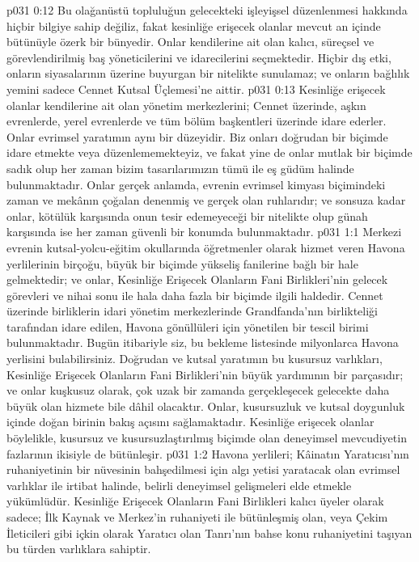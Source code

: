 \vs p031 0:12 Bu olağanüstü topluluğun gelecekteki işleyişsel düzenlenmesi hakkında hiçbir bilgiye sahip değiliz, fakat kesinliğe erişecek olanlar mevcut an içinde bütünüyle özerk bir bünyedir. Onlar kendilerine ait olan kalıcı, süreçsel ve görevlendirilmiş baş yöneticilerini ve idarecilerini seçmektedir. Hiçbir dış etki, onların siyasalarının üzerine buyurgan bir nitelikte sunulamaz; ve onların bağlılık yemini sadece Cennet Kutsal Üçlemesi’ne aittir.
\vs p031 0:13 Kesinliğe erişecek olanlar kendilerine ait olan yönetim merkezlerini; Cennet üzerinde, aşkın evrenlerde, yerel evrenlerde ve tüm bölüm başkentleri üzerinde idare ederler. Onlar evrimsel yaratımın aynı bir düzeyidir. Biz onları doğrudan bir biçimde idare etmekte veya düzenlememekteyiz, ve fakat yine de onlar mutlak bir biçimde sadık olup her zaman bizim tasarılarımızın tümü ile eş güdüm halinde bulunmaktadır. Onlar gerçek anlamda, evrenin evrimsel kimyası biçimindeki zaman ve mekânın çoğalan denenmiş ve gerçek olan ruhlarıdır; ve sonsuza kadar onlar, kötülük karşısında onun tesir edemeyeceği bir nitelikte olup günah karşısında ise her zaman güvenli bir konumda bulunmaktadır.
\vs p031 1:1 Merkezi evrenin kutsal\hyp{}yolcu\hyp{}eğitim okullarında öğretmenler olarak hizmet veren Havona yerlilerinin birçoğu, büyük bir biçimde yükseliş fanilerine bağlı bir hale gelmektedir; ve onlar, Kesinliğe Erişecek Olanların Fani Birlikleri’nin gelecek görevleri ve nihai sonu ile hala daha fazla bir biçimde ilgili haldedir. Cennet üzerinde birliklerin idari yönetim merkezlerinde Grandfanda’nın birlikteliği tarafından idare edilen, Havona gönüllüleri için yönetilen bir tescil birimi bulunmaktadır. Bugün itibariyle siz, bu bekleme listesinde milyonlarca Havona yerlisini bulabilirsiniz. Doğrudan ve kutsal yaratımın bu kusursuz varlıkları, Kesinliğe Erişecek Olanların Fani Birlikleri’nin büyük yardımının bir parçasıdır; ve onlar kuşkusuz olarak, çok uzak bir zamanda gerçekleşecek gelecekte daha büyük olan hizmete bile dâhil olacaktır. Onlar, kusursuzluk ve kutsal doygunluk içinde doğan birinin bakış açısını sağlamaktadır. Kesinliğe erişecek olanlar böylelikle, kusursuz ve kusursuzlaştırılmış biçimde olan deneyimsel mevcudiyetin fazlarının ikisiyle de bütünleşir.
\vs p031 1:2 Havona yerlileri; Kâinatın Yaratıcısı’nın ruhaniyetinin bir nüvesinin bahşedilmesi için algı yetisi yaratacak olan evrimsel varlıklar ile irtibat halinde, belirli deneyimsel gelişmeleri elde etmekle yükümlüdür. Kesinliğe Erişecek Olanların Fani Birlikleri kalıcı üyeler olarak sadece; İlk Kaynak ve Merkez’in ruhaniyeti ile bütünleşmiş olan, veya Çekim İleticileri gibi içkin olarak Yaratıcı olan Tanrı’nın bahse konu ruhaniyetini taşıyan bu türden varlıklara sahiptir.
